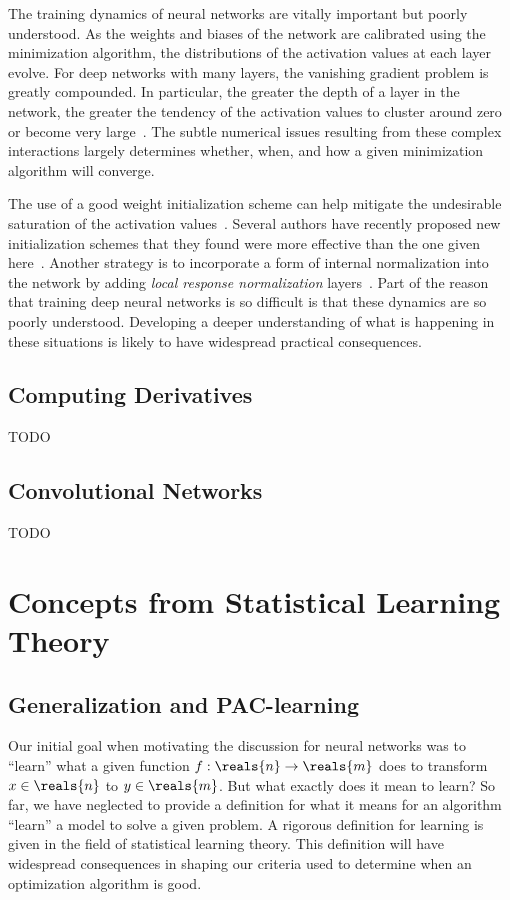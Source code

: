 \documentclass[11pt,a4paper]{article}
\numberwithin{equation}{section}
\begin{document}
The training dynamics of neural networks are vitally important but poorly
understood. As the weights and biases of the network are calibrated using the
minimization algorithm, the distributions of the activation values at each layer
evolve. For deep networks with many layers, the vanishing gradient problem is
greatly compounded. In particular, the greater the depth of a layer in the
network, the greater the tendency of the activation values to cluster around
zero or become very large~\citep{glorot2010understanding}. The subtle numerical
issues resulting from these complex interactions largely determines whether,
when, and how a given minimization algorithm will converge.

The use of a good weight initialization scheme can help mitigate the undesirable
saturation of the activation values~\citep{glorot2010understanding}. Several
authors have recently proposed new initialization schemes that they found were
more effective than the one given here~\citep{glorot2010understanding,
martens2010deep}. Another strategy is to incorporate a form of internal
normalization into the network by adding \emph{local response normalization}
layers~\citep{krizhevsky2012imagenet}. Part of the reason that training deep
neural networks is so difficult is that these dynamics are so poorly understood.
Developing a deeper understanding of what is happening in these situations is
likely to have widespread practical consequences.

\subsection{Computing Derivatives}

TODO

\subsection{Convolutional Networks}

TODO

\section{Concepts from Statistical Learning Theory}

\subsection{Generalization and PAC-learning}

Our initial goal when motivating the discussion for neural networks was to
``learn'' what a given function $f: \reals{n} \to \reals{m}$ does to transform
$x \in \reals{n}$ to $y \in \reals{m}$. But what exactly does it mean to learn?
So far, we have neglected to provide a definition for what it means for an
algorithm ``learn'' a model to solve a given problem. A rigorous definition for
learning is given in the field of statistical learning theory. This definition
will have widespread consequences in shaping our criteria used to determine when
an optimization algorithm is good.
\end{document}
